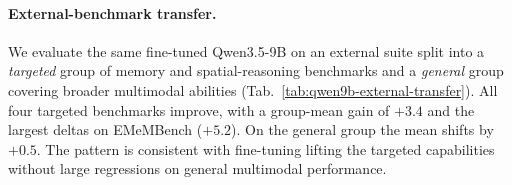 

\paragraph{External-benchmark transfer.}
We evaluate the same fine-tuned Qwen3.5-9B on an external suite split into a \emph{targeted} group of memory and spatial-reasoning benchmarks and a \emph{general} group covering broader multimodal abilities (Tab.~\ref{tab:qwen9b-external-transfer}). All four targeted benchmarks improve, with a group-mean gain of $+3.4$ and the largest deltas on EMeMBench ($+5.2$). On the general group the mean shifts by $+0.5$. The pattern is consistent with fine-tuning lifting the targeted capabilities without large regressions on general multimodal performance.